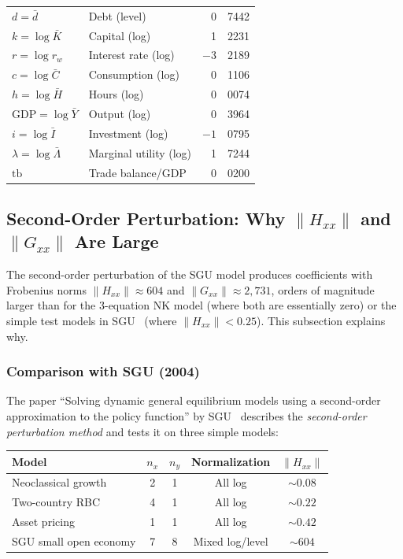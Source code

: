 \documentclass[11pt,a4paper]{article}
\theoremstyle{definition}
\begin{document}
	\begin{center}
	\begin{tabular}{llr@{.}l}
		\toprule
		$d = \bar{d}$ & Debt (level) & 0&7442 \\
		$k = \log\bar{K}$ & Capital (log) & 1&2231 \\
		$r = \log r_w$ & Interest rate (log) & $-3$&2189 \\
		$c = \log\bar{C}$ & Consumption (log) & 0&1106 \\
		$h = \log\bar{H}$ & Hours (log) & 0&0074 \\
		$\text{GDP} = \log\bar{Y}$ & Output (log) & 0&3964 \\
		$i = \log\bar{I}$ & Investment (log) & $-1$&0795 \\
		$\lambda = \log\bar{\Lambda}$ & Marginal utility (log) & 1&7244 \\
		$\text{tb}$ & Trade balance/GDP & 0&0200 \\
		\bottomrule
	\end{tabular}
	\end{center}


	\subsection{Second-Order Perturbation: Why $\|H_{xx}\|$ and $\|G_{xx}\|$ Are Large}
	\label{sec:sgu_hxx}

	The second-order perturbation of the SGU model produces coefficients with Frobenius norms $\|H_{xx}\| \approx 604$ and $\|G_{xx}\| \approx 2{,}731$, orders of magnitude larger than for the 3-equation NK model (where both are essentially zero) or the simple test models in SGU~\cite{sgu2004} (where $\|H_{xx}\| < 0.25$).
	This subsection explains why.

	\subsubsection{Comparison with SGU (2004)}

	The paper ``Solving dynamic general equilibrium models using a second-order approximation to the policy function'' by SGU~\cite{sgu2004} describes the \emph{second-order perturbation method} and tests it on three simple models:

	\begin{center}
	\begin{tabular}{lcccc}
		\toprule
		\textbf{Model} & $n_x$ & $n_y$ & \textbf{Normalization} & $\|H_{xx}\|$ \\
		\midrule
		Neoclassical growth     & 2 & 1 & All log & $\sim 0.08$ \\
		Two-country RBC         & 4 & 1 & All log & $\sim 0.22$ \\
		Asset pricing           & 1 & 1 & All log & $\sim 0.42$ \\
		\midrule
		SGU small open economy  & 7 & 8 & Mixed log/level & $\sim 604$ \\
		\bottomrule
	\end{tabular}
	\end{center}
\end{document}
